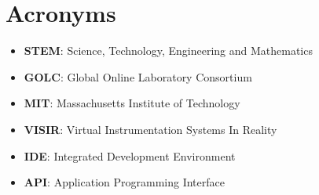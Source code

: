 \chapter*{Acronyms}

\begin{itemize}
	\item \textbf{STEM}: Science, Technology, Engineering and Mathematics

	\item \textbf{GOLC}: Global Online Laboratory Consortium

	\item \textbf{MIT}: Massachusetts Institute of Technology

	\item \textbf{VISIR}: Virtual Instrumentation Systems In Reality

	\item \textbf{IDE}: Integrated Development Environment

	\item \textbf{API}: Application Programming Interface
\end{itemize}
